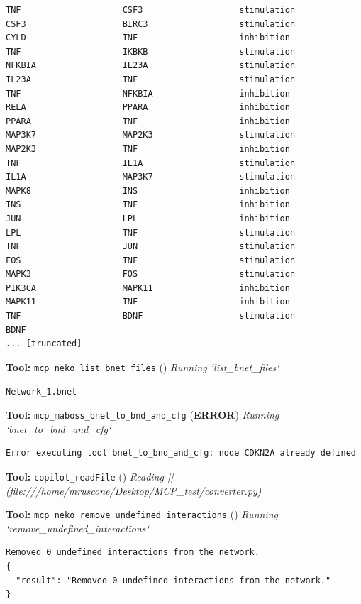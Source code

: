 \documentclass[11pt,a4paper]{article}
\begin{document}
\begin{toolokbox}
\begin{lstlisting}
TNF                    CSF3                   stimulation
CSF3                   BIRC3                  stimulation
CYLD                   TNF                    inhibition
TNF                    IKBKB                  stimulation
NFKBIA                 IL23A                  stimulation
IL23A                  TNF                    stimulation
TNF                    NFKBIA                 inhibition
RELA                   PPARA                  inhibition
PPARA                  TNF                    inhibition
MAP3K7                 MAP2K3                 stimulation
MAP2K3                 TNF                    inhibition
TNF                    IL1A                   stimulation
IL1A                   MAP3K7                 stimulation
MAPK8                  INS                    inhibition
INS                    TNF                    inhibition
JUN                    LPL                    inhibition
LPL                    TNF                    stimulation
TNF                    JUN                    stimulation
FOS                    TNF                    stimulation
MAPK3                  FOS                    stimulation
PIK3CA                 MAPK11                 inhibition
MAPK11                 TNF                    inhibition
TNF                    BDNF                   stimulation
BDNF   
... [truncated]
\end{lstlisting}
\end{toolokbox}
\begin{toolokbox}
\textbf{Tool:} \texttt{mcp\_neko\_list\_bnet\_files} (\checkmark)
\textit{Running `list\_bnet\_files`}
\begin{lstlisting}
Network_1.bnet
\end{lstlisting}
\end{toolokbox}
\begin{toolerrbox}
\textbf{Tool:} \texttt{mcp\_maboss\_bnet\_to\_bnd\_and\_cfg} (\textbf{ERROR})
\textit{Running `bnet\_to\_bnd\_and\_cfg`}
\begin{lstlisting}
Error executing tool bnet_to_bnd_and_cfg: node CDKN2A already defined
\end{lstlisting}
\end{toolerrbox}
\begin{toolokbox}
\textbf{Tool:} \texttt{copilot\_readFile} (\checkmark)
\textit{Reading [](file:///home/mruscone/Desktop/MCP\_test/converter.py)}
\end{toolokbox}
\begin{toolokbox}
\textbf{Tool:} \texttt{mcp\_neko\_remove\_undefined\_interactions} (\checkmark)
\textit{Running `remove\_undefined\_interactions`}
\begin{lstlisting}
Removed 0 undefined interactions from the network.
{
  "result": "Removed 0 undefined interactions from the network."
}
\end{lstlisting}
\end{toolokbox}
\end{document}
